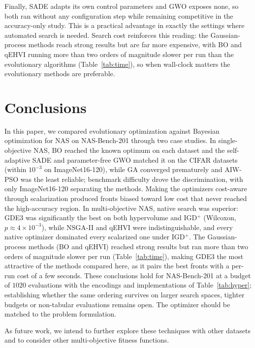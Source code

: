 \documentclass[runningheads]{llncs}
\begin{document}
Finally, SADE adapts its own control parameters and GWO exposes none, so both ran without any configuration step while remaining competitive in the accuracy-only study. This is a practical advantage in exactly the settings where automated search is needed. Search cost reinforces this reading: the Gaussian-process methods reach strong results but are far more expensive, with BO and qEHVI running more than two orders of magnitude slower per run than the evolutionary algorithms (Table~\ref{tab:time}), so when wall-clock matters the evolutionary methods are preferable.

%
%
\section{Conclusions} \label{SEC5}
\noindent 
In this paper, we compared evolutionary optimization against Bayesian optimization for NAS on NAS-Bench-201 through two case studies. In single-objective NAS, BO reached the known optimum on each dataset and the self-adaptive SADE and parameter-free GWO matched it on the CIFAR datasets (within $10^{-3}$ on ImageNet16-120), while GA converged prematurely and AIW-PSO was the least reliable; benchmark difficulty drove the discrimination, with only ImageNet16-120 separating the methods. Making the optimizers cost-aware through scalarization produced fronts biased toward low cost that never reached the high-accuracy region. In multi-objective NAS, native search was superior: GDE3 was significantly the best on both hypervolume and IGD$^{+}$ (Wilcoxon, $p \approx 4{\times}10^{-3}$), while NSGA-II and qEHVI were indistinguishable, and every native optimizer dominated every scalarized one under IGD$^{+}$. The Gaussian-process methods (BO and qEHVI) reached strong results but ran more than two orders of magnitude slower per run (Table~\ref{tab:time}), making GDE3 the most attractive of the methods compared here, as it pairs the best fronts with a per-run cost of a few seconds. These conclusions hold for NAS-Bench-201 at a budget of $1020$ evaluations with the encodings and implementations of Table~\ref{tab:hyper}; establishing whether the same ordering survives on larger search spaces, tighter budgets or non-tabular evaluations remains open. The optimizer should be matched to the problem formulation.

As future work, we intend to further explore these techniques with other datasets and to 
consider other multi-objective fitness functions.





\end{document}
